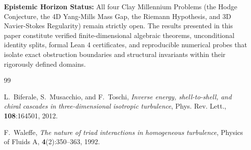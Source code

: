 \documentclass[11pt,a4paper]{article}
\theoremstyle{definition}
\begin{document}
\vspace{0.5em}
\noindent\textbf{Epistemic Horizon Status:} All four Clay Millennium Problems (the Hodge Conjecture, the 4D Yang-Mills Mass Gap, the Riemann Hypothesis, and 3D Navier-Stokes Regularity) remain strictly open. The results presented in this paper constitute verified finite-dimensional algebraic theorems, unconditional identity splits, formal Lean 4 certificates, and reproducible numerical probes that isolate exact obstruction boundaries and structural invariants within their rigorously defined domains.

\begin{thebibliography}{99}

L.~Biferale, S.~Musacchio, and F.~Toschi,
\textit{Inverse energy, shell-to-shell, and chiral cascades in three-dimensional isotropic turbulence},
Phys. Rev. Lett., \textbf{108}:164501, 2012.

F.~Waleffe,
\textit{The nature of triad interactions in homogeneous turbulence},
Physics of Fluids A, \textbf{4}(2):350--363, 1992.

\end{thebibliography}
\end{document}
